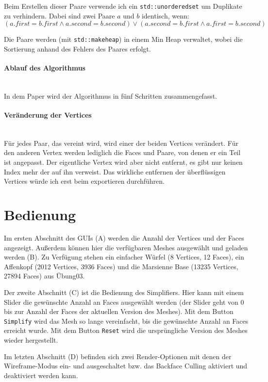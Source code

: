 \documentclass[a4paper,12pt]{book}
\newcommand{\myparagraph}[1]{\paragraph*{#1}\mbox{}\\}
\begin{document}
Beim Erstellen dieser Paare verwende ich ein \texttt{std::unordered\textunderscore set} um Duplikate zu verhindern.
Dabei sind zwei Paare $a$ und $b$ identisch, wenn:
$$(a.first=b.first \land a.second=b.second) \lor (a.second=b.first \land a.first=b.second)$$

Die Paare werden (mit \texttt{std::make\textunderscore heap}) in einem Min Heap verwaltet, wobei die Sortierung anhand des Fehlers des Paares erfolgt.

\myparagraph{Ablauf des Algorithmus}
In dem Paper wird der Algorithmus in fünf Schritten zusammengefasst.

\myparagraph{Veränderung der Vertices}
Für jedes Paar, das vereint wird, wird einer der beiden Vertices verändert.
Für den anderen Vertex werden lediglich die Faces und Paare, von denen er ein Teil ist angepasst.
Der eigentliche Vertex wird aber nicht entfernt, es gibt nur keinen Index mehr der auf ihn verweist.
Das wirkliche entfernen der überflüssigen Vertices würde ich erst beim exportieren durchführen.

\newpage
\section*{Bedienung}

Im ersten Abschnitt des GUIs (A) werden die Anzahl der Vertices und der Faces angezeigt. 
Außerdem können hier die verfügbaren Meshes ausgewählt und geladen werden (B). Zu Verfügung stehen ein einfacher Würfel (8 Vertices, 12 Faces), ein Affenkopf (2012 Vertices, 3936 Faces) und die Marsienne Base (13235 Vertices, 27894 Faces) aus Übung03.

Der zweite Abschnitt (C) ist die Bedienung des Simplifiers. Hier kann mit einem Slider die gewünschte Anzahl an Faces ausgewählt werden (der Slider geht von 0 bis zur Anzahl der Faces der aktuellen Version des Meshes). Mit dem Button \texttt{Simplify} wird das Mesh so lange vereinfacht, bis die gewünschte Anzahl an Faces erreicht wurde. Mit dem Button \texttt{Reset} wird die ursprüngliche Version des Meshes wieder hergestellt.

Im letzten Abschnitt (D) befinden sich zwei Render-Optionen mit denen der Wireframe-Modus ein- und ausgeschaltet bzw. das Backface Culling aktiviert und deaktiviert werden kann.
\end{document}

